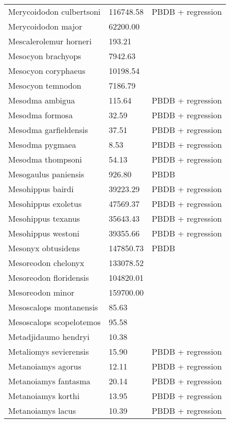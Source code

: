 \begin{center}
\begin{longtable}{p{} p{} p{} }
  Merycoidodon culbertsoni & 116748.58 & PBDB + regression \\ 
  Merycoidodon major & 62200.00 & \cite{McKenna2011} \\ 
  Mescalerolemur horneri & 193.21 & \cite{MacIntyre1966} \\ 
  Mesocyon brachyops & 7942.63 & \cite{Tomiya2013} \\ 
  Mesocyon coryphaeus & 10198.54 & \cite{Tomiya2013} \\ 
  Mesocyon temnodon & 7186.79 & \cite{Tomiya2013} \\ 
  Mesodma ambigua & 115.64 & PBDB + regression \\ 
  Mesodma formosa & 32.59 & PBDB + regression \\ 
  Mesodma garfieldensis & 37.51 & PBDB + regression \\ 
  Mesodma pygmaea & 8.53 & PBDB + regression \\ 
  Mesodma thompsoni & 54.13 & PBDB + regression \\ 
  Mesogaulus paniensis & 926.80 & PBDB \\ 
  Mesohippus bairdi & 39223.29 & PBDB + regression \\ 
  Mesohippus exoletus & 47569.37 & PBDB + regression \\ 
  Mesohippus texanus & 35643.43 & PBDB + regression \\ 
  Mesohippus westoni & 39355.66 & PBDB + regression \\ 
  Mesonyx obtusidens & 147850.73 & PBDB \\ 
  Mesoreodon chelonyx & 133078.52 & \cite{Bever2003} \\ 
  Mesoreodon floridensis & 104820.01 & \cite{Tomiya2013} \\ 
  Mesoreodon minor & 159700.00 & \cite{McKenna2011} \\ 
  Mesoscalops montanensis & 85.63 & \cite{Tomiya2013} \\ 
  Mesoscalops scopelotemos & 95.58 & \cite{Tomiya2013} \\ 
  Metadjidaumo hendryi & 10.38 & \cite{Tomiya2013} \\ 
  Metaliomys sevierensis & 15.90 & PBDB + regression \\ 
  Metanoiamys agorus & 12.11 & PBDB + regression \\ 
  Metanoiamys fantasma & 20.14 & PBDB + regression \\ 
  Metanoiamys korthi & 13.95 & PBDB + regression \\ 
  Metanoiamys lacus & 10.39 & PBDB + regression \\ 

\end{longtable}
\end{center}
